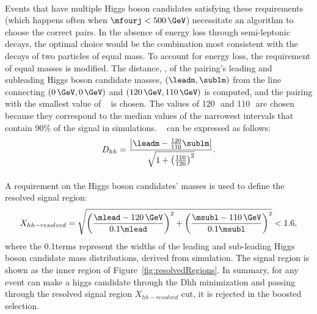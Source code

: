 \paragraph{}
Events that have multiple Higgs boson candidates satisfying these requirements (which happens often when $\mfourj < 500\,\GeV$) necessitate an algorithm to choose the correct pairs. 
In the absence of energy loss through semi-leptonic decays, the optimal choice would be the combination most consistent with the decays of two particles of equal mass.
To account for energy loss, the requirement of equal masses is modified. 
The distance, \Dhh, of the pairing's leading and subleading Higgs boson candidate masses, $\left(\leadm, \sublm\right)$ from the line connecting $\left(0\,\GeV, 0\,\GeV\right)$ and $\left(120\,\GeV, 110\,\GeV\right)$ is computed, and the pairing with the smallest value of \Dhh~ is chosen.
The values of 120\,\GeV\, and 110\,\GeV\, are chosen because they correspond to the median values of the narrowest intervals that contain 90\% of the signal in simulations.%
\Dhh~ can be expressed as follows:
\begin{equation}
D_{hh} = \frac{\left|\leadm - \frac{120}{110}\sublm\right|}{\sqrt{1+\left(\frac{110}{120}\right)^{2}}}.
\end{equation}

\paragraph{}
A requirement on the Higgs boson candidates' masses is used to define the resolved signal region:
\begin{equation}
X_{hh-resolved} = \sqrt{\left(\frac{\mlead - 120\,\GeV}{0.1\mlead}\right)^2 + \left(\frac{\msubl - 110\,\GeV}{0.1\msubl}\right)^2} < 1.6,
\label{eqn:resolvedXhh}
\end{equation}
where the 0.1\mtwoj terms represent the widths of the leading and sub-leading Higgs boson candidate mass distributions, derived from simulation. The signal region is shown as the inner region of Figure~\ref{fig:resolvedRegions}. In summary, for any event can make a higgs candidate through the Dhh minimization and passing through the resolved signal region $X_{hh-resolved}$ cut, it is rejected in the boosted selection.


